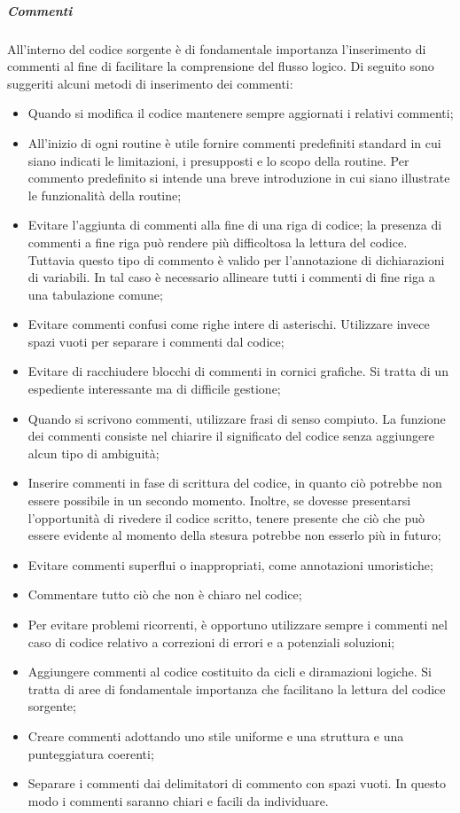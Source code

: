 \subparagraph{Commenti}
All'interno del codice sorgente è di fondamentale importanza l'inserimento di commenti al fine di facilitare la comprensione del flusso logico.
Di seguito sono suggeriti alcuni metodi di inserimento dei commenti:
\begin{itemize}
\item
Quando si modifica il codice mantenere sempre aggiornati i relativi commenti;
\item
All'inizio di ogni routine è utile fornire commenti predefiniti standard in cui siano indicati le limitazioni, i presupposti e lo scopo della routine. Per commento predefinito si intende una breve introduzione in cui siano illustrate le funzionalità della routine;
\item
Evitare l'aggiunta di commenti alla fine di una riga di codice; la presenza di commenti a fine riga può rendere più difficoltosa la lettura del codice. Tuttavia questo tipo di commento è valido per l'annotazione di dichiarazioni di variabili. In tal caso è necessario allineare tutti i commenti di fine riga a una tabulazione comune;
\item
Evitare commenti confusi come righe intere di asterischi. Utilizzare invece spazi vuoti per separare i commenti dal codice;
\item
Evitare di racchiudere blocchi di commenti in cornici grafiche. Si tratta di un espediente interessante ma di difficile gestione;
\item
Quando si scrivono commenti, utilizzare frasi di senso compiuto. La funzione dei commenti consiste nel chiarire il significato del codice senza aggiungere alcun tipo di ambiguità;
\item
Inserire commenti in fase di scrittura del codice, in quanto ciò potrebbe non essere possibile in un secondo momento. Inoltre, se dovesse presentarsi l'opportunità di rivedere il codice scritto, tenere presente che ciò che può essere evidente al momento della stesura potrebbe non esserlo più in futuro;
\item
Evitare commenti superflui o inappropriati, come annotazioni umoristiche;
\item
Commentare tutto ciò che non è chiaro nel codice;
\item
Per evitare problemi ricorrenti, è opportuno utilizzare sempre i commenti nel caso di codice relativo a correzioni di errori e a potenziali soluzioni;
\item
Aggiungere commenti al codice costituito da cicli e diramazioni logiche. Si tratta di aree di fondamentale importanza che facilitano la lettura del codice sorgente;
\item
Creare commenti adottando uno stile uniforme e una struttura e una punteggiatura coerenti;
\item
Separare i commenti dai delimitatori di commento con spazi vuoti. In questo modo i commenti saranno chiari e facili da individuare.
\end{itemize}

